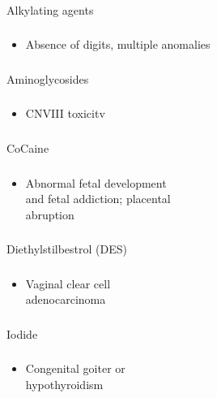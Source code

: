 \documentclass[11pt]{beamer}
\begin{document}
\begin{frame}
 \frametitle{}
Alkylating agents
\end{frame}

\begin{frame}
 \frametitle{}
\begin{itemize}
\item{Absence of digits, multiple anomalies}
\end{itemize}
\end{frame}

\begin{frame}
 \frametitle{}
Aminoglycosides
\end{frame}

\begin{frame}
 \frametitle{}
\begin{itemize}
\item{CNVIII toxicitv}
\end{itemize}
\end{frame}

\begin{frame}
 \frametitle{}
CoCaine
\end{frame}

\begin{frame}
 \frametitle{}
\begin{itemize}
\item{Abnormal fetal development  \\ and fetal addiction; placental \\ abruption }
\end{itemize}
\end{frame}

\begin{frame}
 \frametitle{}
Diethylstilbestrol (DES)
\end{frame}

\begin{frame}
 \frametitle{}
\begin{itemize}
\item{Vaginal clear cell \\ adenocarcinoma}
\end{itemize}
\end{frame}

\begin{frame}
 \frametitle{}
Iodide
\end{frame}

\begin{frame}
 \frametitle{}
\begin{itemize}
\item{Congenital goiter or \\ hypothyroidism}
\end{itemize}
\end{frame}
\end{document}
